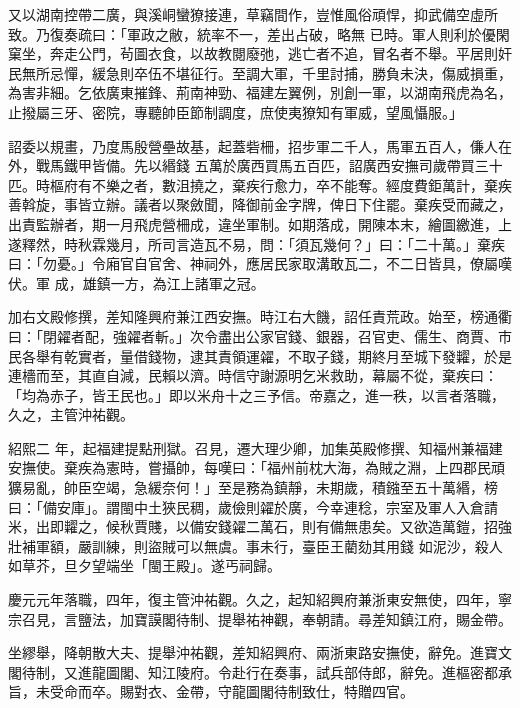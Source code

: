 \begin{pinyinscope}
 又以湖南控帶二廣，與溪峒蠻獠接連，草竊間作，豈惟風俗頑悍，抑武備空虛所致。乃復奏疏曰：「軍政之敝，統率不一，差出占破，略無
 已時。軍人則利於優閑窠坐，奔走公門，茍圖衣食，以故教閱廢弛，逃亡者不追，冒名者不舉。平居則奸民無所忌憚，緩急則卒伍不堪征行。至調大軍，千里討捕，勝負未決，傷威損重，為害非細。乞依廣東摧鋒、荊南神勁、福建左翼例，別創一軍，以湖南飛虎為名，止撥屬三牙、密院，專聽帥臣節制調度，庶使夷獠知有軍威，望風懾服。」



 詔委以規畫，乃度馬殷營壘故基，起蓋砦柵，招步軍二千人，馬軍五百人，傔人在外，戰馬鐵甲皆備。先以緡錢
 五萬於廣西買馬五百匹，詔廣西安撫司歲帶買三十匹。時樞府有不樂之者，數沮撓之，棄疾行愈力，卒不能奪。經度費鉅萬計，棄疾善斡旋，事皆立辦。議者以聚斂聞，降御前金字牌，俾日下住罷。棄疾受而藏之，出責監辦者，期一月飛虎營柵成，違坐軍制。如期落成，開陳本末，繪圖繳進，上遂釋然，時秋霖幾月，所司言造瓦不易，問：「須瓦幾何？」曰：「二十萬。」棄疾曰：「勿憂。」令廂官自官舍、神祠外，應居民家取溝敢瓦二，不二日皆具，僚屬嘆伏。軍
 成，雄鎮一方，為江上諸軍之冠。



 加右文殿修撰，差知隆興府兼江西安撫。時江右大饑，詔任責荒政。始至，榜通衢曰：「閉糴者配，強糴者斬。」次令盡出公家官錢、銀器，召官吏、儒生、商賈、市民各舉有乾實者，量借錢物，逮其責領運糴，不取子錢，期終月至城下發糶，於是連檣而至，其直自減，民賴以濟。時信守謝源明乞米救助，幕屬不從，棄疾曰：「均為赤子，皆王民也。」即以米舟十之三予信。帝嘉之，進一秩，以言者落職，久之，主管沖祐觀。



 紹熙二
 年，起福建提點刑獄。召見，遷大理少卿，加集英殿修撰、知福州兼福建安撫使。棄疾為憲時，嘗攝帥，每嘆曰：「福州前枕大海，為賊之淵，上四郡民頑獷易亂，帥臣空竭，急緩奈何！」至是務為鎮靜，未期歲，積鏹至五十萬緡，榜曰：「備安庫」。謂閩中土狹民稠，歲儉則糴於廣，今幸連稔，宗室及軍人入倉請米，出即糶之，候秋賈賤，以備安錢糴二萬石，則有備無患矣。又欲造萬鎧，招強壯補軍額，嚴訓練，則盜賊可以無虞。事未行，臺臣王藺劾其用錢
 如泥沙，殺人如草芥，旦夕望端坐「閩王殿」。遂丐祠歸。



 慶元元年落職，四年，復主管沖祐觀。久之，起知紹興府兼浙東安無使，四年，寧宗召見，言鹽法，加寶謨閣待制、提舉祐神觀，奉朝請。尋差知鎮江府，賜金帶。



 坐繆舉，降朝散大夫、提舉沖祐觀，差知紹興府、兩浙東路安撫使，辭免。進寶文閣待制，又進龍圖閣、知江陵府。令赴行在奏事，試兵部侍郎，辭免。進樞密都承旨，未受命而卒。賜對衣、金帶，守龍圖閣待制致仕，特贈四官。




\end{pinyinscope}
